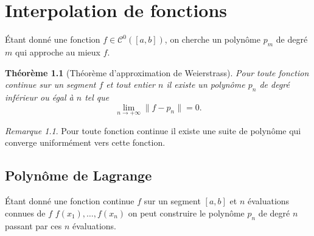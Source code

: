 \documentclass[12pt]{book}
\newtheorem{theorem}[lemma]{Théorème}
\theoremstyle{definition}
\theoremstyle{remark}
\newtheorem*{remark}{Remarque}
\begin{document}
	\chapter{Interpolation de fonctions}
	Étant donné une fonction $f \in \mathcal{C}^{0}([a,b])$, on cherche un polynôme $p_m$ de degré $m$ qui approche au mieux $f$.
	\begin{theorem}[Théorème d'approximation de Weierstrass]
		Pour toute fonction continue sur un segment $f$ et tout entier $n$ il existe un polynôme $p_{n}$ de degré inférieur ou égal à $n$ tel que  \[
		\lim_{n \rightarrow +\infty} \|f-p_{n}\| = 0
		.\] 
	\end{theorem}
	\begin{remark}
		Pour toute fonction continue il existe une suite de polynôme qui converge uniformément vers cette fonction.
	\end{remark}
	\section{Polynôme de Lagrange}
	Étant donné une fonction continue $f$ sur un segment $[a,b]$ et $n$ évaluations connues de $f$ $f(x_1),\ldots, f(x_n)$ on peut construire le polynôme $p_n$ de degré $n$ passant par ces $n$ évaluations.
\end{document}
